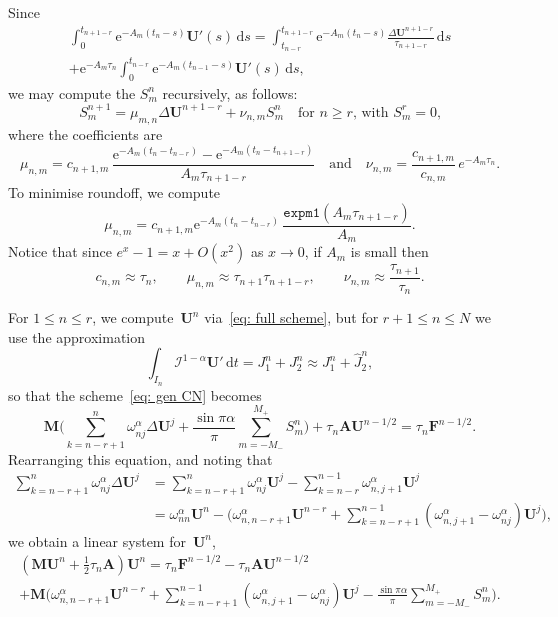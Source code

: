 \documentclass[a4paper,12pt]{article}
\newcommand{\bs}[1]{\boldsymbol{#1}}
\newcommand{\ud}{\mathrm{d}}
\newcommand{\ue}{\mathrm{e}}
\begin{document}
Since
\begin{multline*}
\int_0^{t_{n+1-r}}\ue^{-A_m(t_n-s)}\bs{U}'(s)\,\ud s
    =\int_{t_{n-r}}^{t_{n+1-r}}\ue^{-A_m(t_n-s)}
    \frac{\Delta\bs{U}^{n+1-r}}{\tau_{n+1-r}}\,\ud s\\
    +\ue^{-A_m\tau_n}\int_0^{t_{n-r}}\ue^{-A_m(t_{n-1}-s)}\bs{U}'(s)\,\ud s,
\end{multline*}
we may compute the $S^n_m$ recursively, as follows:
\[
S^{n+1}_m=\mu_{m,n}\Delta\bs{U}^{n+1-r}+\nu_{n,m}S^n_m
\quad\text{for $n\ge r$, with $S^r_m=0$,}
\]
where the coefficients are
\[
\mu_{n,m}=c_{n+1,m}\,\frac{\ue^{-A_m(t_n-t_{n-r})}-\ue^{-A_m(t_n-t_{n+1-r})}}%
{A_m\tau_{n+1-r}}
\quad\text{and}\quad
\nu_{n,m}=\frac{c_{n+1,m}}{c_{n,m}}\,e^{-A_m\tau_n}.
\]
To minimise roundoff, we compute
\[
\mu_{n,m}=c_{n+1,m}\ue^{-A_m(t_n-t_{n-r})}\,
    \frac{\mathtt{expm1}(A_m\tau_{n+1-r})}{A_m}.
\]
Notice that since $e^x-1=x+O(x^2)$ as $x\to0$, if $A_m$ is small then
\[
c_{n,m}\approx\tau_n,\qquad
\mu_{n,m}\approx\tau_{n+1}\tau_{n+1-r},\qquad
\nu_{n,m}\approx\frac{\tau_{n+1}}{\tau_n}.
\]

For $1\le n\le r$, we compute~$\bs{U}^n$ via~\eqref{eq: full scheme}, but for
$r+1\le n\le N$ we use the approximation
\[
\int_{I_n}\mathcal{I}^{1-\alpha}\bs{U}'\,\ud t=J_1^n+J_2^n
    \approx J_1^n+\hat J_2^n,
\]
so that the scheme~\eqref{eq: gen CN} becomes
\[
\bs{M}\biggl(\sum_{k=n-r+1}^n \omega^\alpha_{nj}\Delta\bs{U}^j
    +\frac{\sin\pi\alpha}{\pi}\sum_{m=-M_-}^{M_+} S^n_m\biggr)
    +\tau_n\bs{A}\bs{U}^{n-1/2}=\tau_n\bs{F}^{n-1/2}.
\]
Rearranging this equation, and noting that
\begin{align*}
\sum_{k=n-r+1}^n\omega^\alpha_{nj}\Delta\bs{U}^j
    &=\sum_{k=n-r+1}^n\omega^\alpha_{nj}\bs{U}^j
    -\sum_{k=n-r}^{n-1}\omega^\alpha_{n,j+1}\bs{U}^j\\
    &=\omega^\alpha_{nn}\bs{U}^n-\biggl(\omega^\alpha_{n,n-r+1}\bs{U}^{n-r}
    +\sum_{k=n-r+1}^{n-1}(\omega^\alpha_{n,j+1}-\omega^\alpha_{nj})\bs{U}^j
    \biggr),
\end{align*}
we obtain a linear system for~$\bs{U}^n$,
\begin{multline*}
(\bs{M}\bs{U}^n+\tfrac12\tau_n\bs{A})\bs{U}^n=\tau_n\bs{F}^{n-1/2}
    -\tau_n\bs{A}\bs{U}^{n-1/2}\\
    +\bs{M}\biggl(\omega^\alpha_{n,n-r+1}\bs{U}^{n-r}
    +\sum_{k=n-r+1}^{n-1}(\omega^\alpha_{n,j+1}-\omega^\alpha_{nj})\bs{U}^j
    -\frac{\sin\pi\alpha}{\pi}\sum_{m=-M_-}^{M_+} S^n_m\biggr).
\end{multline*}
\end{document}
